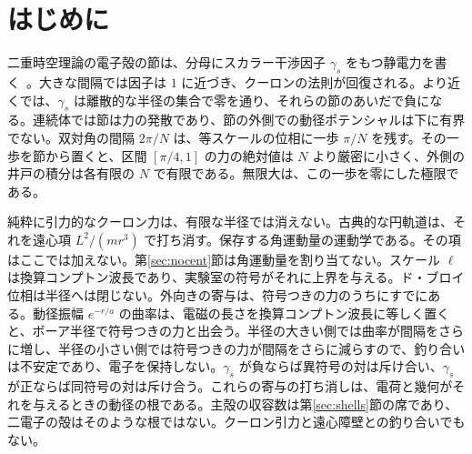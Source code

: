 \documentclass[a4paper]{article}
\begin{document}
\begin{abstract}
\end{abstract}

\section{はじめに}

二重時空理論の電子殻の節は、分母にスカラー干渉因子 \(\gamma_s\) をもつ静電力を書く~\cite{dst-main}。大きな間隔では因子は \(1\) に近づき、クーロンの法則が回復される。より近くでは、\(\gamma_s\) は離散的な半径の集合で零を通り、それらの節のあいだで負になる。連続体では節は力の発散であり、節の外側での動径ポテンシャルは下に有界でない。双対角の間隔 \(2\pi/N\) は、等スケールの位相に一歩 \(\pi/N\) を残す。その一歩を節から置くと、区間 \([\pi/4,1]\) の力の絶対値は \(N\) より厳密に小さく、外側の井戸の積分は各有限の \(N\) で有限である。無限大は、この一歩を零にした極限である。

純粋に引力的なクーロン力は、有限な半径では消えない。古典的な円軌道は、それを遠心項 \(L^{2}/(m r^{3})\) で打ち消す。保存する角運動量の運動学である。その項はここでは加えない。第\ref{sec:nocent}節は角運動量を割り当てない。スケール \(\ell\) は換算コンプトン波長であり、実験室の符号がそれに上界を与える。ド・ブロイ位相は半径へは閉じない。外向きの寄与は、符号つきの力のうちにすでにある。動径振幅 \(e^{-r/a}\) の曲率は、電磁の長さを換算コンプトン波長に等しく置くと、ボーア半径で符号つきの力と出会う。半径の大きい側では曲率が間隔をさらに増し、半径の小さい側では符号つきの力が間隔をさらに減らすので、釣り合いは不安定であり、電子を保持しない。\(\gamma_s\) が負ならば異符号の対は斥け合い、\(\gamma_s\) が正ならば同符号の対は斥け合う。これらの寄与の打ち消しは、電荷と幾何がそれを与えるときの動径の根である。主殻の収容数は第\ref{sec:shells}節の席であり、二電子の殻はそのような根ではない。クーロン引力と遠心障壁との釣り合いでもない。
\end{document}
